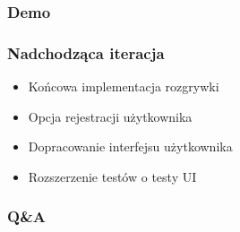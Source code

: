 \documentclass{beamer}
\begin{document}
                \begin{frame}
                  \frametitle{Demo}

                \end{frame}
                \begin{frame}

                  \frametitle{Nadchodząca iteracja}
                  \begin{itemize}
                    \item Końcowa implementacja rozgrywki
                    \item Opcja rejestracji użytkownika
                    \item Dopracowanie interfejsu użytkownika
                    \item Rozszerzenie testów o testy UI
                  \end{itemize}
                \end{frame}
                \begin{frame}
                  \frametitle{Q\&A}
                \end{frame}

                
\end{document}
